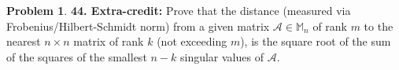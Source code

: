 \documentclass{article}
\theoremstyle{definition}
\newtheorem*{prob*}{Problem}
\newcommand{\A}{\mathcal{A}}
\begin{document}
\newpage




\begin{prob*}\textbf{44. Extra-credit:} Prove that the distance (measured via Frobenius/Hilbert-Schmidt norm) from a given matrix $\A \in \mathbb{M}_n$ of rank $m$ to the nearest $n\times n$ matrix of rank $k$ (not exceeding $m$), is the square root of the sum of the squares of the smallest $n-k$ singular values of $\A$. 
\end{prob*}
\end{document}
